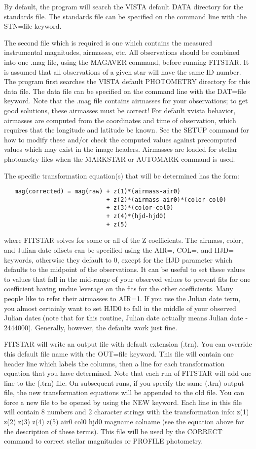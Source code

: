 By default, the program will search the VISTA default DATA directory for
the standards file.  The standards file can be specified on the command
line with the STN=file keyword.

The second file which is required is one which contains the measured 
instrumental magnitudes, airmasses, etc.
All observations should be combined into one .mag file, using the MAGAVER
command, before running FITSTAR. It is assumed that all observations of a
given star will have the same ID number.  The program first searches the
VISTA default PHOTOMETRY directory for this data file. The data file can be
specified on the command line with the DAT=file keyword. Note that the .mag
file contains airmasses for your observations; to get good solutions, these
airmasses must be correct! For default xvista behavior, airmasses are
computed from the coordinates and time of observation, which requires that
the longitude and latitude be known. See the SETUP command for how to
modify these and/or check the computed values against precomputed values 
which may exist in the image headers. Airmasses are loaded for stellar
photometry files when the MARKSTAR or AUTOMARK command is used.

The specific transformation equation(s) that will be determined
has the form: 
\begin{verbatim}
   mag(corrected) = mag(raw) + z(1)*(airmass-air0)
                             + z(2)*(airmass-air0)*(color-col0)
                             + z(3)*(color-col0)
                             + z(4)*(hjd-hjd0)
                             + z(5)
\end{verbatim}
where FITSTAR solves for some or all of the Z coefficients. The airmass,
color, and Julian date offsets can be specified using the AIR=, COL=, and
HJD= keywords, otherwise they default to 0, except for the HJD parameter
which defaults to the midpoint of the observations.  It can be useful to
set these values to values that fall in the mid-range of your observed
values to prevent fits for one coefficient having undue leverage on the
fits for the other coefficients. Many people like to refer their airmasses
to AIR=1.  If you use the Julian date term, you almost certainly want to
set HJD0 to fall in the middle of your observed Julian dates (note that for
this routine, Julian date actually means Julian date - 2444000). Generally,
however, the defaults work just fine.
 
FITSTAR will write an output file with default extension (.trn).  You can
override this default file name with the OUT=file keyword.  This file will
contain one header line which labels the columns, then a line for each
transformation equation that you have determined. Note that each run of
FITSTAR will add one line to the (.trn) file.  On subsequent runs, if you
specify the same (.trn) output file, the new transformation equations will
be appended to the old file.  You can force a new file to be opened by
using the NEW keyword. Each line in this file will contain 8 numbers and 2
character strings with the transformation info: z(1) z(2) z(3) z(4) z(5)
air0 col0 hjd0 magname colname (see the equation above for the description
of these terms).  This file will be used by the CORRECT command to correct
stellar magnitudes or PROFILE photometry.

